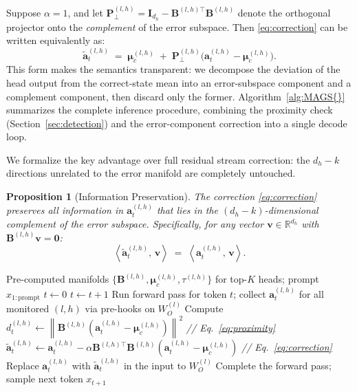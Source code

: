 \documentclass{article}
\newtheorem{proposition}{Proposition}
\newcommand{\R}{\mathbb{R}}
\newcommand{\ba}{\bm{a}}
\newcommand{\bmu}{\bm{\mu}}
\newcommand{\bB}{\bm{B}}
\newcommand{\bI}{\bm{I}}
\newcommand{\norm}[1]{\left\| #1 \right\|}
\newcommand{\inner}[2]{\left\langle #1,\, #2 \right\rangle}
\newcommand{\ours}{MAGS}
\begin{document}
Suppose $\alpha=1$, and let $\bm{P}_\perp^{(l,h)} = \bI_{d_h} - \bB^{(l,h)\top}\bB^{(l,h)}$ denote
the orthogonal projector onto the \emph{complement} of the error subspace.
Then \eqref{eq:correction} can be written equivalently as:
\begin{equation}
    \tilde{\ba}_t^{(l,h)}
    \;=\;
    \bmu_c^{(l,h)}
    \;+\;
    \bm{P}_\perp^{(l,h)}
    \bigl(\ba_t^{(l,h)} - \bmu_c^{(l,h)}\bigr).
    \label{eq:correction_proj}
\end{equation}
This form makes the semantics transparent: we decompose the deviation of the head output from the correct-state mean into an error-subspace component and a complement component, then discard only the former. Algorithm~\ref{alg:\ours{}} summarizes the complete inference procedure,  combining the proximity check (Section~\ref{sec:detection}) and the error-component correction into a single decode loop.

We formalize the key advantage over full residual stream correction: the $d_h - k$ directions unrelated to the error manifold are completely untouched.

\begin{proposition}[Information Preservation]
    The correction \eqref{eq:correction} preserves all information in
    $\ba_t^{(l,h)}$ that lies in the $(d_h - k)$-dimensional complement of
    the error subspace.
    Specifically, for any vector $\bm{v} \in \R^{d_h}$ with
    $\bB^{(l,h)}\bm{v} = \bm{0}$:
    \begin{equation}
        \inner{\tilde{\ba}_t^{(l,h)}}{\bm{v}}
        \;=\;
        \inner{\ba_t^{(l,h)}}{\bm{v}}.
    \end{equation}
\end{proposition}

\begin{algorithm}[t]
\caption{Manifold-Guided Head Steering (\ours{}) — Inference}
\label{alg:\ours{}}
\begin{algorithmic}[1]
\Require Pre-computed manifolds $\{\bB^{(l,h)}, \bmu_c^{(l,h)}, \tau^{(l,h)}\}$ for top-$K$ heads; prompt $x_{1:\mathrm{prompt}}$
\State $t \leftarrow 0$
    \State $t \leftarrow t + 1$
    \State Run forward pass for token $t$; collect $\ba_t^{(l,h)}$ for all
           monitored $(l,h)$ via pre-hooks on $W_O^{(l)}$
        \State Compute $d_t^{(l,h)} \leftarrow
               \norm{\bB^{(l,h)}(\ba_t^{(l,h)} - \bmu_c^{(l,h)})}^2$
               \hfill\textit{// Eq.~\eqref{eq:proximity}}
            \State $\tilde{\ba}_t^{(l,h)} \leftarrow
                   \ba_t^{(l,h)} - \alpha\bB^{(l,h)\top}\bB^{(l,h)}
                   (\ba_t^{(l,h)} - \bmu_c^{(l,h)})$
                   \hfill\textit{// Eq.~\eqref{eq:correction}}
            \State Replace $\ba_t^{(l,h)}$ with $\tilde{\ba}_t^{(l,h)}$ in
                   the input to $W_O^{(l)}$
        \EndIf
    \EndFor
    \State Complete the forward pass; sample next token $x_{t+1}$
\EndWhile
\end{algorithmic}
\end{algorithm}
\end{document}
